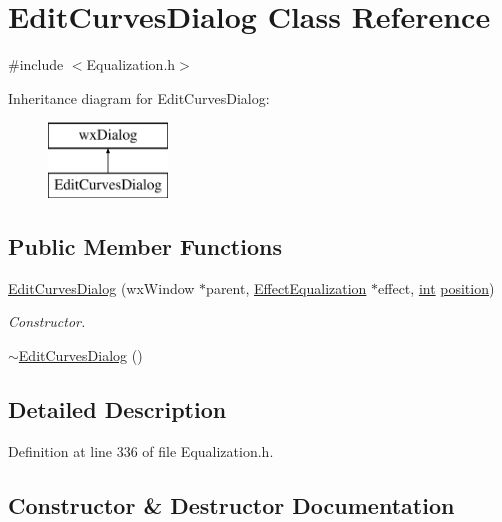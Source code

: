 \hypertarget{class_edit_curves_dialog}{}\section{Edit\+Curves\+Dialog Class Reference}
\label{class_edit_curves_dialog}


{\ttfamily \#include $<$Equalization.\+h$>$}

Inheritance diagram for Edit\+Curves\+Dialog\+:\begin{figure}[H]
\begin{center}
\leavevmode
\includegraphics[height=2.000000cm]{class_edit_curves_dialog}
\end{center}
\end{figure}
\subsection*{Public Member Functions}
\begin{DoxyCompactItemize}
\item 
\hyperlink{class_edit_curves_dialog_afb95af59729b739882797dd5d77be376}{Edit\+Curves\+Dialog} (wx\+Window $\ast$parent, \hyperlink{class_effect_equalization}{Effect\+Equalization} $\ast$effect, \hyperlink{xmltok_8h_a5a0d4a5641ce434f1d23533f2b2e6653}{int} \hyperlink{structposition}{position})
\begin{DoxyCompactList}\small\item\em Constructor. \end{DoxyCompactList}\item 
\hyperlink{class_edit_curves_dialog_a4d3f86b886eb6e97b1bd26297a8cd8d0}{$\sim$\+Edit\+Curves\+Dialog} ()
\end{DoxyCompactItemize}


\subsection{Detailed Description}


Definition at line 336 of file Equalization.\+h.



\subsection{Constructor \& Destructor Documentation}
